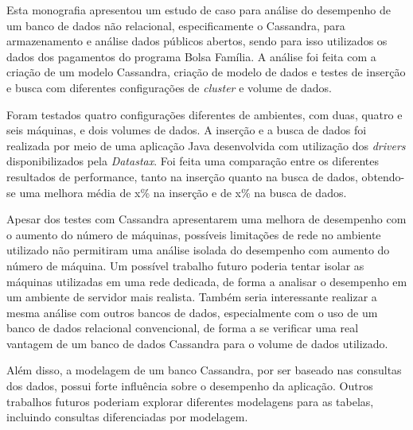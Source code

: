 Esta monografia apresentou um estudo de caso para análise do desempenho de um banco de dados não relacional, especificamente o Cassandra, para armazenamento e análise dados públicos abertos, sendo para isso utilizados os dados dos pagamentos do programa Bolsa Família. A análise foi feita com a criação de um modelo Cassandra, criação de modelo de dados e testes de inserção e busca com diferentes configurações de \emph{cluster} e volume de dados.

Foram testados quatro configurações diferentes de ambientes, com duas, quatro e seis máquinas, e dois volumes de dados. A inserção e a busca de dados foi realizada por meio de uma aplicação Java desenvolvida com utilização dos \emph{drivers} disponibilizados pela \emph{Datastax}. Foi feita uma comparação entre os diferentes resultados de performance, tanto na inserção quanto na busca de dados, obtendo-se uma melhora média de x\% na inserção e de x\% na busca de dados.

Apesar dos testes com Cassandra apresentarem uma melhora de desempenho com o aumento do número de máquinas, possíveis limitações de rede no ambiente utilizado não permitiram uma análise isolada do desempenho com aumento do número de máquina. Um possível trabalho futuro poderia tentar isolar as máquinas utilizadas em uma rede dedicada, de forma a analisar o desempenho em um ambiente de servidor mais realista. Também seria interessante realizar a mesma análise com outros bancos de dados, especialmente com o uso de um banco de dados relacional convencional, de forma a se verificar uma real vantagem de um banco de dados Cassandra para o volume de dados utilizado.

Além disso, a modelagem de um banco Cassandra, por ser baseado nas consultas dos dados, possui forte influência sobre o desempenho da aplicação. Outros trabalhos futuros poderiam explorar diferentes modelagens para as tabelas, incluindo consultas diferenciadas por modelagem.
